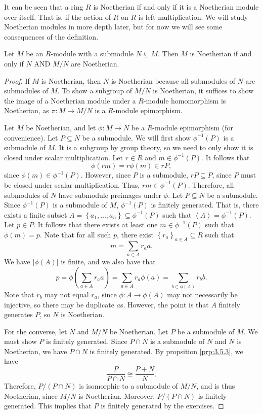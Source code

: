 It can be seen that a ring $R$ is Noetherian if and only if it is a Noetherian module over itself. That is, if the action of $R$ on $R$ is left-multiplication. We will study Noetherian modules in more depth later, but for now we will see some consequences of the definition.
\begin{proposition}\label{prp:3.6.5}
	Let $M$ be an $R$-module with a submodule $N\subseteq M$. Then $M$ is Noetherian if and only if $N$ AND $M /N$ are Noetherian.
\end{proposition}
\begin{proof}
	If $M$ is Noetherian, then $N$ is Noetherian because all submodules of $N$ are submodules of $M$. To show a subgroup of $M /N$ is Noetherian, it suffices to show the image of a Noetherian module under a $R$-module homomorphism is Noetherian, as $\pi : M \to M /N$ is a $R$-module epimorphism. 
	
	Let $M$ be Noetherian, and let $\phi : M \to N$ be a $R$-module epimorphism (for convenience). Let $P\subseteq N$ be a submodule. We will first show $\phi ^{-1}(P)$ is a submodule of $M$. It is a subgroup by group theory, so we need to only show it is closed under scalar multiplication. Let $r\in R$ and $m\in \phi ^{-1}(P)$. It follows that
	\[
		\phi (rm)=r\phi (m)\in rP
	,\]
	since $\phi (m)\in \phi ^{-1}(P)$. However, since $P$ is a submodule, $rP\subseteq P$, since $P$ must be closed under scalar multiplication. Thus, $rm\in \phi ^{-1}(P)$. Therefore, all submodules of $N$ have submodule preimages under $\phi $. Let $P\subseteq N$ be a submodule. Since $\phi ^{-1}(P)$ is a submodule of $M$, $\phi ^{-1}(P)$ is finitely generated. That is, there exists a finite subset $A=\left\{ a_1, \dots, a_n  \right\} \subseteq \phi ^{-1}(P)$ such that $\left\langle A \right\rangle =\phi ^{-1}\left( P \right) $. Let $p\in P$. It follows that there exists at least one $m\in \phi ^{-1}\left(P \right) $ such that $\phi (m)=p$. Note that for all such $p$, there exist $\left\{ r_a \right\}_{a\in A}\subseteq R$ such that
	\[
		m=\sum_{a\in A} r_a a
	.\]
	We have $\left| \phi (A) \right| $ is finite, and we also have that
	\[
		p=\phi \left( \sum_{a\in A} r_aa \right) =\sum_{a\in A} r_a\phi (a)=\sum_{b\in \phi (A)} r_bb
	.\]
	Note that $r_b$ may not equal $r_a$, since $\phi : A \to \phi (A)$ may not necessarily be injective, so there may be duplicate $a$s. However, the point is that $A$ finitely generates $P$, so $N$ is Noetherian.

	For the converse, let $N$ and $M/N $ be Noetherian. Let $P$ be a submodule of $M$. We must show $P$ is finitely generated. Since $P\cap N$ is a submodule of $N$ and $N$ is Noetherian, we have $P\cap N$ is finitely generated. By propsition \ref{prp:3.5.3}, we have
	\[
		\frac{P}{P\cap N}\cong \frac{P+N}{N}
	.\]
	Therefore, $P /(P\cap N)$ is isomorphic to a submodule of $M /N$, and is thus Noetherian, since $M /N$ is Noetherian. Moreover, $P /(P\cap N)$ is finitely generated. This implies that $P$ is finitely generated by the exercises.
\end{proof}

